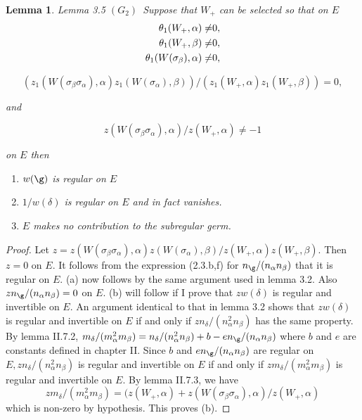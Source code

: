 \documentclass{memo-l}
\newtheorem{lemma}[theorem]{Lemma}
\theoremstyle{definition}
\theoremstyle{remark}
\numberwithin{section}{chapter}
\numberwithin{equation}{chapter}
\begin{document}
\begin{lemma}{Lemma 3.5}  $(G_{2})$\  Suppose that $W_{+}$ can be selected so that on
$E$
$$\aligned
{\theta}_{1}(W_{+},{\alpha})\ne& 0, \\
{\theta}_{1}(W_{+},{\beta})\ne &0, \\
{\theta}_{1}(W({\sigma}_{\beta}),{\alpha})\ne& 0,
\endaligned$$

$$(z_{1}(W({\sigma}_{\beta}{\sigma}_{\alpha}),{\alpha})z_{1}
(W({\sigma}_{\alpha}),{\beta}))/(z_{1}(W_{+},{\alpha})z_{1}(W_{+},
{\beta})) = 0,
$$

and

$$
z(W({\sigma}_{\beta}{\sigma}_{\alpha}),{\alpha})/z(W_{+},{\alpha}) \ne  -1
$$

on $E$ then
\begin{enumerate}[label=\alph*)]
\item $w({\g})$ is regular on $E$
\item $1/w({\delta})$ is regular on $E$ and in fact vanishes.
\item $E$ makes no contribution to the subregular germ.
\end{enumerate}
\end{lemma}

\medskip

\begin{proof}    Let $z = z(W({\sigma}_{\beta}{\sigma}_{\alpha}),
{\alpha})z(W({\sigma}_{\alpha}),{\beta})/z(W_{+},{\alpha})z(W_{+},{\beta})$.
 Then $z = 0$ on $E$.
 It follows from the expression (2.3.b,f) for $n_{{\g}}/(n_{\alpha}
n_{\beta})$ that it is regular on $E$.
(a) now follows by the same argument used in lemma 3.2.
 Also $zn_{{\g}}/(n_{\alpha}n_{\beta}) = 0$ on $E$.
(b) will follow if I prove that $zw({\delta})$ is regular and
invertible on $E$.
 An argument identical to that in lemma 3.2 shows that $zw({\delta})$ is
regular and invertible on $E$ if and only if $zn_{{\delta}}/(n_{\alpha}^{2}
n_{\beta})$ has the same property.
 By lemma II.7.2, $m_{{\delta}}/(m_{\alpha}^{2}m_{\beta}) =
n_{{\delta}}/(n_{\alpha}^{2}n_{\beta}) + b - en_{{\g}}/(n_{\alpha}
n_{\beta})$ where $b$ and $e$ are constants defined in chapter II.
 Since $b$ and $en_{{\g}}/(n_{\alpha}n_{\beta})$ are regular on $E,
zn_{{\delta}}/(n_{\alpha}^{2}n_{\beta})$ is regular and invertible on $E$
if and only if $zm_{{\delta}}/(m_{\alpha}^{2}m_{\beta})$ is regular and
invertible on $E$.
 By lemma II.7.3, we have
$$
zm_{{\delta}}/(m_{\alpha}^{2}m_{\beta}) = (z(W_{+},{\alpha})+
z(W({\sigma}_{\beta}{\sigma}_{\alpha}),{\alpha})/z(W_{+},{\alpha})
$$
which is non-zero by hypothesis.  This proves (b).
\end{proof}
\end{document}
